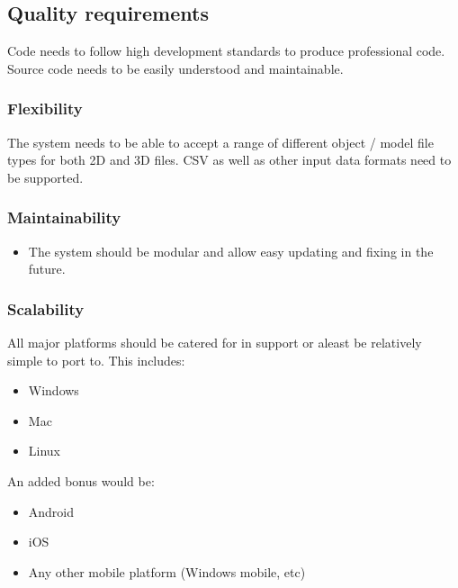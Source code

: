 \documentclass[a4paper,12pt]{article}
\begin{document}
\subsection{Quality requirements}
Code needs to follow high development standards to produce professional code. Source code needs to be easily understood and maintainable.

\subsubsection{Flexibility}
The system needs to be able to accept a range of different object / model file types for both 2D and 3D files. CSV as well as other input data formats need to be supported.

\subsubsection{Maintainability}
	\begin{itemize}
		\item The system should be modular and allow easy updating and fixing in the future.
	\end{itemize}

\subsubsection{Scalability}
All major platforms should be catered for in support or aleast be relatively simple to port to. This includes:
	\begin{itemize}
		\item Windows
		\item Mac
		\item Linux		
	\end{itemize}
An added bonus would be:
	\begin{itemize}
		\item Android
		\item iOS
		\item Any other mobile platform (Windows mobile, etc)
	\end{itemize}
	
\end{document}
